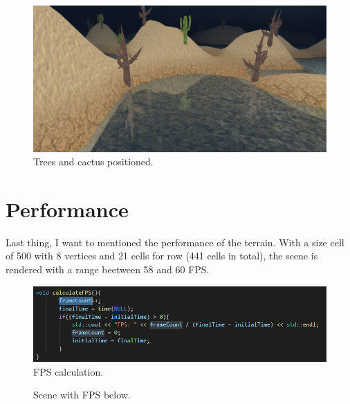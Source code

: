 \newpage


\begin{figure}[hbt!]
	\centering
	\includegraphics[width= 1
	\textwidth]{images/object3.png}
	\caption{Trees and cactus positioned.}
\end{figure}

\section{Performance}
Last thing, I want to mentioned the performance of the terrain. With a size cell of 500 with 8 vertices and 21 cells for row (441 cells in total), the scene is rendered with a range beetween 58 and 60 FPS.

\begin{figure}[hbt!]
	\centering
	\includegraphics[width= 1
	\textwidth]{images/fps2.png}
	\caption{FPS calculation.}
\end{figure}

\newpage

\begin{figure}[hbt!]
	\centering
	\vspace*{\fill}
	
	\noindent{}%
	
	\caption{Scene with FPS below.}
\end{figure} 

